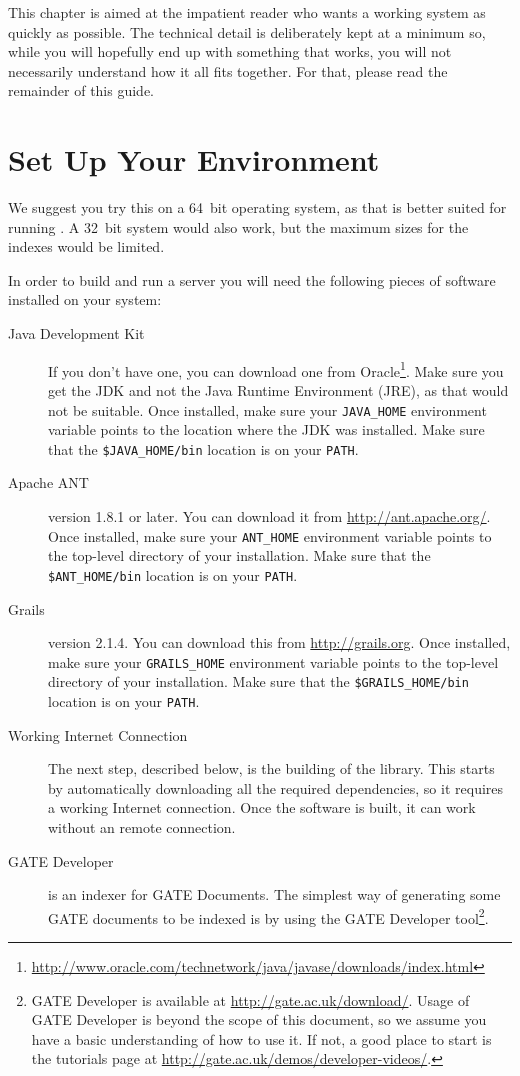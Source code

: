 This chapter is aimed at the impatient reader who wants a working system as
quickly as possible. The technical detail is deliberately kept at a minimum so,
while you will hopefully end up with something that works, you will not
necessarily understand how it all fits together. For that, please read the
remainder of this guide.

\section{Set Up Your Environment}
We suggest you try this on a 64~bit operating system, as that is better suited
for running \Mimir{}. A 32~bit system would also work, but the maximum sizes for
the indexes would be limited.

In order to build and run a \Mimir{} server you will need the following pieces
of software installed on your system:
\begin{description}
  \item[Java Development Kit] If you don't have one, you can download one from
  Oracle\footnote{\url{http://www.oracle.com/technetwork/java/javase/downloads/index.html}}.
  Make sure you get the JDK and not the Java Runtime Environment (JRE), as that
  would not be suitable. Once installed, make sure your \verb!JAVA_HOME!
  environment variable points to the location where the JDK was installed.  Make
  sure that the \verb!$JAVA_HOME/bin! location is on your \verb!PATH!.
  \item[Apache ANT] version 1.8.1 or later. You can download it from
  \url{http://ant.apache.org/}. Once installed, make sure your \verb!ANT_HOME!
  environment variable points to the top-level directory of your installation.
  Make  sure that the \verb!$ANT_HOME/bin! location is on your \verb!PATH!.
  \item[Grails] version 2.1.4. You can download this from
  \url{http://grails.org}. Once installed, make sure your \verb!GRAILS_HOME!
  environment variable points to the top-level directory of your installation.
  Make sure that the \verb!$GRAILS_HOME/bin! location is on your \verb!PATH!.
  \item[Working Internet Connection] The next step, described below, is the
  building of the \Mimir{} library. This starts by automatically downloading all
  the required dependencies, so it requires a working Internet connection. Once
  the software is built, it can work without an remote connection.
  \item[GATE Developer] \Mimir{} is an indexer for GATE Documents. The simplest
  way of generating some GATE documents to be indexed is by using the GATE
  Developer tool\footnote{GATE Developer is available at
  \url{http://gate.ac.uk/download/}. Usage of GATE Developer is beyond the scope
  of this document, so we assume you have a basic understanding of how to use
  it. If not, a good place to start is the tutorials page at
  \url{http://gate.ac.uk/demos/developer-videos/}.}. 
\end{description}
%
